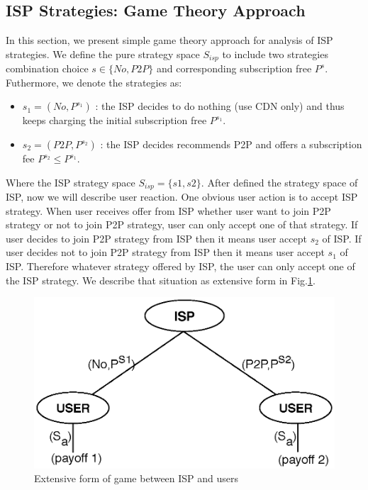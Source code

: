 \documentclass[paper]{ieice}
\begin{document}
\subsection{ISP Strategies: Game Theory Approach}
In this section, we present simple game theory approach for analysis of ISP strategies. 
We define the pure strategy space $S_{isp}$ to include two strategies combination choice $s \in \{No, P2P\}$ and corresponding subscription free $P^{s}$.
Futhermore, we denote the strategies as:
\begin{itemize}
	\item $s_1 = (No, P^{s_1})$ : the ISP decides to do nothing (use CDN only) and thus keeps charging the initial subscription free $P^{s_1}$.
	\item $s_2 = (P2P, P^{s_2})$ : the ISP decides recommends P2P and offers a subscription fee $P^{s_2} \le P^{s_1}$.
\end{itemize}
Where the ISP strategy space $S_{isp} = \{s1,s2\}$.
After defined the strategy space of ISP, now we will describe user reaction.
One obvious user action is to accept ISP strategy.
When user receives offer from ISP whether user want to join P2P strategy or not to join P2P strategy, user can only accept one of that strategy.  
If user decides to join P2P strategy from ISP then it means user accept $s_2$ of ISP.
If user decides not to join P2P strategy from ISP then it means user accept $s_1$ of ISP.
Therefore whatever strategy offered by ISP, the user can only accept one of the ISP strategy.
We describe that situation as extensive form in Fig.\ref{fig:gametree}.

\begin{figure}[tb] 
\begin{center}
\includegraphics[scale=0.35]{graphs/game-tree.eps}
\end{center}
\caption{Extensive form of game between ISP and users}
\label{fig:gametree}
\vspace{-2mm}
\end{figure}
\end{document}
